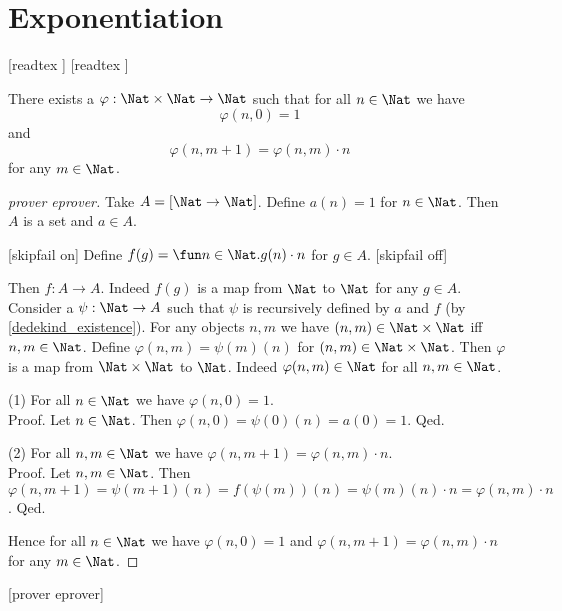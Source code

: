 \documentclass{article}
\begin{document}
  \section{Exponentiation}\label{sec:exponentiation}

  \begin{forthel}
    [readtex ]
    [readtex ]
  \end{forthel}

  \begin{forthel}
    \begin{lemma}\label{exp_existence}
      There exists a $\varphi : \Nat \times \Nat \to \Nat$ such
      that for all $n \in \Nat$ we have
      \[\varphi(n, 0) = 1\]
      and
      \[\varphi(n, m + 1) = \varphi(n,m) \cdot n\]
      for any $m \in \Nat$.
    \end{lemma}
    \begin{proof}
      [prover eprover]
      Take $A = [\Nat \to \Nat]$.
      Define $a(n) = 1$ for $n \in \Nat$.
      Then $A$ is a set and $a \in A$.

      [skipfail on] %
      Define $f(g) = \fun n \in \Nat. g(n) \cdot n$ for $g \in A$.
      [skipfail off]

      Then $f : A \to A$.
      Indeed $f(g)$ is a map from $\Nat$ to $\Nat$ for any $g \in A$.
      Consider a $\psi : \Nat \to A$ such that $\psi$ is recursively defined by
      $a$ and $f$ (by \cref{dedekind_existence}).
      For any objects $n, m$ we have $(n,m) \in \Nat \times \Nat$ iff
      $n, m \in \Nat$.
      Define $\varphi(n,m) = \psi(m)(n)$ for $(n,m) \in \Nat \times \Nat$.
      Then $\varphi$ is a map from $\Nat \times \Nat$ to $\Nat$.
      Indeed $\varphi(n,m) \in \Nat$ for all $n, m \in \Nat$.

      (1) For all $n \in \Nat$ we have $\varphi(n,0) = 1$. \\
      Proof.
        Let $n \in \Nat$.
        Then $\varphi(n,0)
          = \psi(0)(n)
          = a(0)
          = 1$.
      Qed.

      (2) For all $n, m \in \Nat$ we have $\varphi(n, m + 1) =
      \varphi(n,m) \cdot n$. \\
      Proof.
        Let $n, m \in \Nat$.
        Then $\varphi(n, m + 1)
          = \psi(m + 1)(n)
          = f(\psi(m))(n)
          = \psi(m)(n) \cdot n
          = \varphi(n,m) \cdot n$.
      Qed.

      Hence for all $n \in \Nat$ we have $\varphi(n, 0) = 1$ and
      $\varphi(n, m + 1) = \varphi(n,m) \cdot n$ for any $m \in \Nat$.
    \end{proof}
    [prover eprover]
  \end{forthel}
\end{document}
